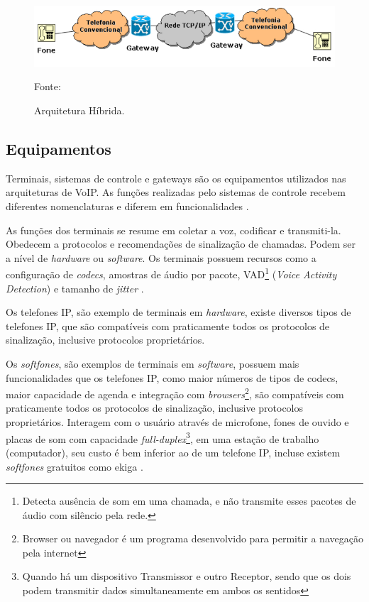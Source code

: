 \begin{figure}[h]
	\centering
	\includegraphics[width=15.0cm]{imagens/hibrida.jpg}
	\caption{Arquitetura Híbrida.}
    \label{Figura11}
    Fonte: \cite{eduardomaronasmonks2006}
\end{figure}

\subsection{Equipamentos}
Terminais, sistemas de controle e gateways são os equipamentos utilizados nas arquiteturas de VoIP. As funções realizadas pelo sistemas de controle recebem diferentes nomenclaturas e diferem em funcionalidades \cite{theodorewallingford2005}.

As funções dos terminais se resume em coletar a voz, codificar e transmiti-la. Obedecem a protocolos e recomendações de sinalização de chamadas. Podem ser a nível de \textit{hardware} ou \textit{software}. Os terminais possuem recursos como a configuração de \textit{codecs}, amostras de áudio por pacote, VAD\footnote{Detecta ausência de som em uma chamada, e não transmite esses pacotes de áudio com silêncio pela rede.} (\textit{Voice Activity Detection}) e tamanho de \textit{jitter} \cite{davidson2008}.

Os telefones IP, são exemplo de terminais em \textit{hardware}, existe diversos tipos de telefones IP, que são compatíveis com praticamente todos os protocolos de sinalização, inclusive protocolos proprietários.

Os \textit{softfones}, são exemplos de terminais em \textit{software}, possuem mais funcionalidades que os telefones IP, como maior números de tipos de codecs, maior capacidade de agenda e integração com \textit{browsers}\footnote{Browser ou navegador é um programa desenvolvido para permitir a navegação pela internet}, são compatíveis com praticamente todos os protocolos de sinalização, inclusive protocolos proprietários. Interagem com o usuário através de microfone, fones de ouvido e placas de som com capacidade \textit{full-duplex}\footnote{Quando há um dispositivo Transmissor e outro Receptor, sendo que os dois podem transmitir dados simultaneamente em ambos os sentidos}, em uma estação de trabalho (computador), seu custo é bem inferior ao de um telefone IP, incluse existem \textit{softfones} gratuitos como ekiga \cite{glauciadasilvaribeiro2011}.

